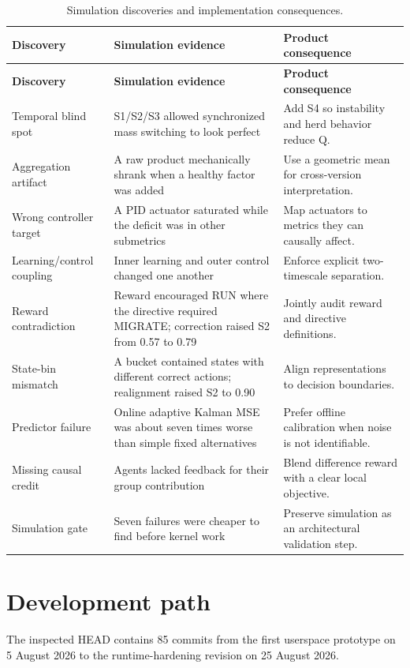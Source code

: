 \documentclass[11pt,a4paper,oneside]{report}
\begin{document}
\begin{longtable}{@{}p{37mm}p{59mm}p{57mm}@{}}
\caption{Simulation discoveries and implementation consequences.}\label{tab:sim}\\
\toprule
\textbf{Discovery} & \textbf{Simulation evidence} & \textbf{Product consequence} \\
\midrule
\endfirsthead
\toprule
\textbf{Discovery} & \textbf{Simulation evidence} & \textbf{Product consequence} \\
\midrule
\endhead
Temporal blind spot & S1/S2/S3 allowed synchronized mass switching to look
perfect & Add S4 so instability and herd behavior reduce Q. \\
Aggregation artifact & A raw product mechanically shrank when a healthy factor
was added & Use a geometric mean for cross-version interpretation. \\
Wrong controller target & A PID actuator saturated while the deficit was in
other submetrics & Map actuators to metrics they can causally affect. \\
Learning/control coupling & Inner learning and outer control changed one another
& Enforce explicit two-timescale separation. \\
Reward contradiction & Reward encouraged RUN where the directive required
MIGRATE; correction raised S2 from 0.57 to 0.79 & Jointly audit reward and
directive definitions. \\
State-bin mismatch & A bucket contained states with different correct actions;
realignment raised S2 to 0.90 & Align representations to decision boundaries. \\
Predictor failure & Online adaptive Kalman MSE was about seven times worse than
simple fixed alternatives & Prefer offline calibration when noise is not
identifiable. \\
Missing causal credit & Agents lacked feedback for their group contribution &
Blend difference reward with a clear local objective. \\
Simulation gate & Seven failures were cheaper to find before kernel work &
Preserve simulation as an architectural validation step. \\
\bottomrule
\end{longtable}

\section{Development path}

The inspected HEAD contains 85 commits from the first userspace prototype on
5 August 2026 to the runtime-hardening revision on 25 August 2026.
\end{document}

